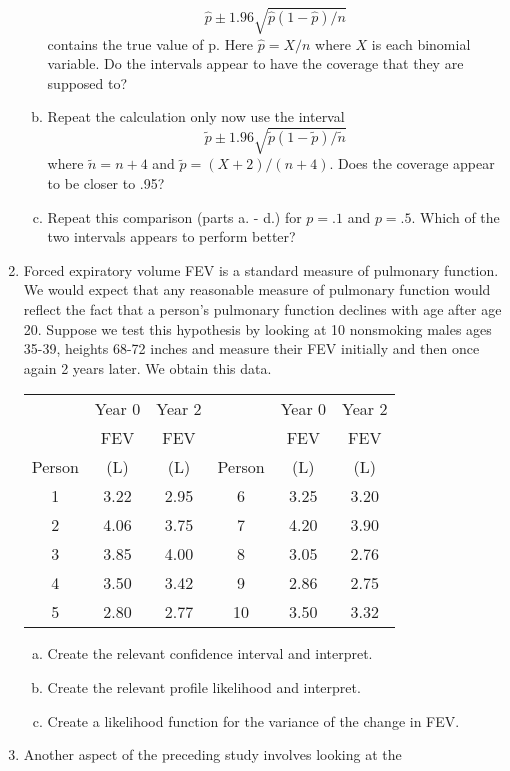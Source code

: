 \documentclass[12pt]{article}
\begin{document}
\begin{enumerate}[Problem 1.]
\begin{enumerate}[a.]
$$
\hat p \pm 1.96\sqrt{\hat p (1 - \hat p) / n}
$$
contains the true value of p. Here $\hat p = X/n$ where $X$ is each
binomial variable. Do the intervals appear to have the coverage that
they are supposed to?
\item Repeat the calculation only now use the interval
$$
\tilde p \pm 1.96\sqrt{\tilde p (1 - \tilde p) / \tilde{n}}
$$
where $\tilde{n} = n+4$ and $\tilde p = (X + 2) / (n + 4)$. Does the coverage appear to be
closer to .95?
\item Repeat this comparison (parts a. - d.) for $p = .1$ and $p =
  .5$. Which of the two intervals appears to perform better?
\end{enumerate}
\item Forced expiratory volume FEV is a standard measure of pulmonary
  function.  We would expect that any reasonable measure of pulmonary
  function would reflect the fact that a person's pulmonary function
  declines with age after age 20.  Suppose we test this hypothesis by
  looking at 10 nonsmoking males ages 35-39, heights 68-72 inches and
  measure their FEV initially and then once again 2 years later.  We
  obtain this data.
\begin{center}
\begin{tabular}{cccccc}
\hline
& Year 0 & Year 2 && Year 0 & Year 2 \\
& FEV & FEV && FEV & FEV \\
Person & (L) & (L) & Person & (L) & (L) \vspace{+0.05in} \\ \hline
1 & 3.22 & 2.95 & 6 & 3.25 & 3.20 \\
2 & 4.06 & 3.75 & 7 & 4.20 & 3.90 \\
3 & 3.85 & 4.00 & 8 & 3.05 & 2.76 \\
4 & 3.50 & 3.42 & 9 & 2.86 & 2.75 \\
5 & 2.80 & 2.77 & 10 & 3.50 & 3.32 \vspace{+0.05in} \\ \hline
\end{tabular}
\end{center}
\begin{enumerate}[a.]
\item Create the relevant confidence interval and interpret.
\item Create the relevant profile likelihood and interpret.
\item Create a likelihood function for the variance of the change in
  FEV.
\end{enumerate}
\item Another aspect of the preceding study involves looking at the

\end{enumerate}
\end{document}
